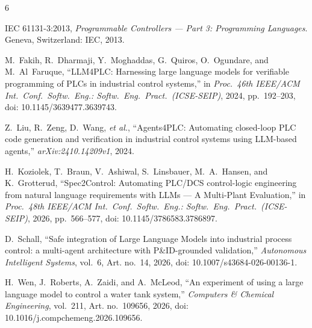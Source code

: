 \documentclass[conference]{IEEEtran}
\begin{document}
\begin{thebibliography}{6}

IEC 61131-3:2013, \emph{Programmable Controllers --- Part 3: Programming Languages}. Geneva, Switzerland: IEC, 2013.

M.~Fakih, R.~Dharmaji, Y.~Moghaddas, G.~Quiros, O.~Ogundare, and M.~Al~Faruque, ``LLM4PLC: Harnessing large language models for verifiable programming of PLCs in industrial control systems,'' in \emph{Proc.\ 46th IEEE/ACM Int.\ Conf.\ Softw.\ Eng.: Softw.\ Eng.\ Pract.\ (ICSE-SEIP)}, 2024, pp.~192--203, doi: 10.1145/3639477.3639743.

Z.~Liu, R.~Zeng, D.~Wang, \emph{et al.}, ``Agents4PLC: Automating closed-loop PLC code generation and verification in industrial control systems using LLM-based agents,'' \emph{arXiv:2410.14209v1}, 2024.

H.~Koziolek, T.~Braun, V.~Ashiwal, S.~Linsbauer, M.~A.~Hansen, and K.~Grotterud, ``Spec2Control: Automating PLC/DCS control-logic engineering from natural language requirements with LLMs --- A Multi-Plant Evaluation,'' in \emph{Proc.\ 48th IEEE/ACM Int.\ Conf.\ Softw.\ Eng.: Softw.\ Eng.\ Pract.\ (ICSE-SEIP)}, 2026, pp.~566--577, doi: 10.1145/3786583.3786897.

D.~Schall, ``Safe integration of Large Language Models into industrial process control: a multi-agent architecture with P\&ID-grounded validation,'' \emph{Autonomous Intelligent Systems}, vol.~6, Art. no.~14, 2026, doi: 10.1007/s43684-026-00136-1.

H.~Wen, J.~Roberts, A.~Zaidi, and A.~McLeod, ``An experiment of using a large language model to control a water tank system,'' \emph{Computers \& Chemical Engineering}, vol.~211, Art. no.~109656, 2026, doi: 10.1016/j.compchemeng.2026.109656.

\end{thebibliography}
\end{document}
